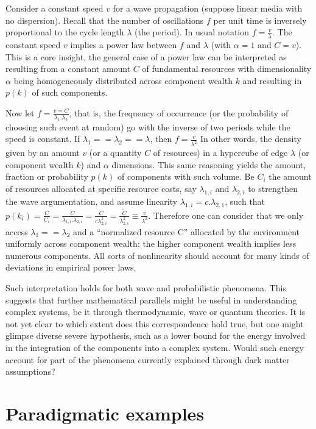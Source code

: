 \documentclass[a4paper, 11pt]{article} %
\begin{document}
Consider a constant speed $v$ for a wave propagation
(suppose linear media with no dispersion).
Recall that the number of oscillations $f$ per unit time is
inversely proportional to the cycle length $\lambda$ (the period).
In usual notation $f=\frac{v}{\lambda}$.
The constant speed $v$ implies a power law between 
$f$ and $\lambda$ (with $\alpha=1$ and $C=v$).
This is a core insight, the general case of a power law can
be interpreted as resulting from a constant amount $C$ of
fundamental resources with dimensionality $\alpha$ 
being homogeneously distributed across
component wealth $k$ and 
resulting in $p(k)$ of such components.

Now let $f=\frac{v=C}{\lambda_1 . \lambda_2}$, that is,
the frequency of occurrence
(or the probability of choosing such event at random) go with the inverse of two periods while the speed is constant. 
If $\lambda_1==\lambda_2==\lambda$, then $f=\frac{v}{\lambda^2}$
In other words, the density given by an amount $v$
(or a quantity $C$ of resources) in a hypercube of
edge $\lambda$ (or component wealth $k$)
and $\alpha$ dimensions.
This same reasoning yields the amount, fraction or probability $p(k)$
of components with such volume.
Be $C_i$ the amount of resources allocated at
specific resource costs,
say $\lambda_{1,i}$ and $\lambda_{2,i}$ to strengthen the wave argumentation,
and assume linearity $\lambda_{1,i}=c.\lambda_{2,1}$,
such that
$p(k_i)=\frac{C}{C_i}=\frac{C}{\lambda_{1,i}.\lambda_{2,i}}=
\frac{C}{c\lambda_{2,i}^2}=\frac{\widetilde{C}}{\lambda_{2,i}^2}\equiv\frac{v}{\lambda^2}$.
Therefore one can consider that we only access $\lambda_1==\lambda_2$ and a ``normalized resource C'' allocated by the environment uniformly across component wealth: the higher component wealth implies less numerous components. 
All sorts of nonlinearity should account
for many kinds of deviations in empirical power laws.

Such interpretation holds for 
both wave and probabilistic phenomena.
This suggests that further mathematical
parallels might be useful in understanding complex
systems, be it through thermodynamic, wave or quantum theories.
It is not yet clear to which extent does this correspondence hold true,
but one might glimpse diverse severe hypothesis,
such as a lower bound for the energy involved in the integration of
the components into a complex system.
Would such energy account for part of the phenomena
currently explained through dark matter assumptions?

\section{Paradigmatic examples}\label{sec:par}
\end{document}
